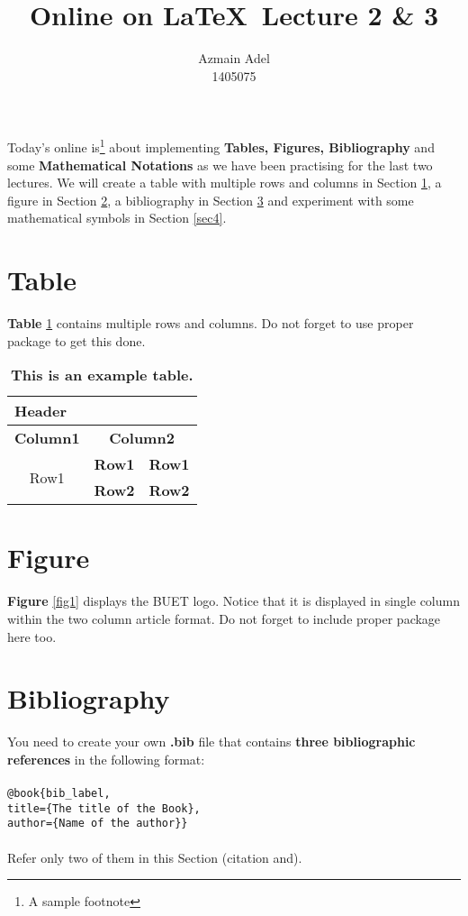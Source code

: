 \documentclass{article}
\begin{document}
\begin{twocolumn}

\title{Online on \LaTeX~Lecture 2 \& 3}
\author{Azmain Adel\\1405075}
\maketitle

Today’s online is\footnote{A sample footnote} about implementing \textbf{Tables, Figures, Bibliography} and some \textbf{Mathematical Notations} as we have been 
practising for the last two lectures. We will create a table with multiple
 rows and columns in Section \ref{sec:1}, a figure in Section \ref{sec2}, a bibliography 
 in Section \ref{sec3} and experiment with some mathematical symbols in Section \ref{sec4}.

\section{Table} \label{sec:1}
\textbf{Table} \ref{table1} contains multiple rows and columns. Do not forget to use proper package to get this done.

\begin{table}[!tbh]
  \centering
    \begin{tabular}{|c|c|c|}
      \hline
      \multicolumn{3}{|l|}{\textbf{Header}}\\
      \hline
      \textbf{Column1} & \multicolumn{2}{|c|}{\textbf{Column2}}\\
      \hline
      \multirow{2}{*}{Row1} & \textbf{Row1} & \textbf{Row1}\\
      \cline{2-3}
      & \textbf{Row2} & \textbf{Row2}\\
      \hline
    \end{tabular}
  \label{table1}
  \caption{\textbf{This is an example table.}}
\end{table}

\section{Figure} \label{sec2}
\textbf{Figure} \ref{fig1} displays the BUET logo. Notice that it is displayed in single column within the two column article format. Do not forget to include proper package here too.


\section{Bibliography} \label{sec3}
You need to create your own \textbf{.bib} file that contains \textbf{three bibliographic references} in the following format:
\\\\
\texttt{@book\{bib\_label,\\
title=\{The title of the Book\},\\
author=\{Name of the author\}\}
}
\\~\\
\noindent
Refer only two of them in this Section (citation \cite{eos} and).


\end{twocolumn}
\end{document}
